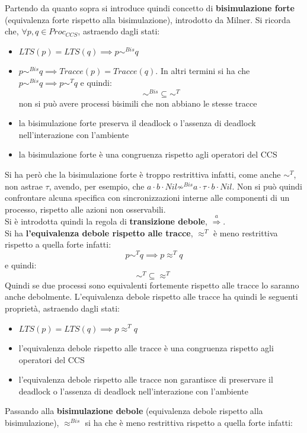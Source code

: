 Partendo da quanto sopra si introduce quindi concetto di \textbf{bisimulazione
  forte} (equivalenza forte rispetto alla bisimulazione), introdotto da
Milner. Si ricorda che, $\forall p, q\in Proc_{CCS}$, 
astraendo dagli stati:
\begin{itemize}
  \item $LTS(p)=LTS(q)\implies p\sim^{Bis}q$
  
  \item $p\sim^{Bis}q\implies Tracce(p)=Tracce(q)$. In altri termini si ha che
  $p\sim^{Bis}q\implies p\sim^T q$ e quindi:
  \[\sim^{Bis}\subseteq \sim^T\]
  non si può avere processi bisimili che non abbiano le stesse tracce
  \item la bisimulazione forte preserva il deadlock o l'assenza di deadlock
  nell'interazione con l'ambiente
  \item la bisimulazione forte è una congruenza rispetto agli operatori del CCS
\end{itemize}
Si ha però che la bisimulazione forte è troppo restrittiva infatti, come anche
$\sim^T$, non astrae $\tau$, avendo, per esempio, che $a\cdot b\cdot
Nil\not\sim^{Bis} a\cdot \tau\cdot b\cdot Nil$. Non si può quindi confrontare
alcuna specifica con sincronizzazioni interne alle componenti di un processo,
rispetto alle azioni non osservabili.\\ 
Si è introdotta quindi la regola di \textbf{transizione debole},
$\stackrel{a}{\Rightarrow}$.\\ 
Si ha \textbf{l'equivalenza debole rispetto alle tracce}, $\approx^T$ è meno
restrittiva rispetto a quella forte infatti:
\[p\sim^T q\implies p\approx^T q\]
e quindi:
\[\sim^T \subseteq \approx^T\]
Quindi se due processi sono equivalenti fortemente rispetto alle tracce lo
saranno anche debolmente. L'equivalenza debole rispetto alle tracce ha quindi le
seguenti proprietà, astraendo dagli stati:
\begin{itemize}
  \item $LTS(p)=LTS(q)\implies p\approx^{T}q$
  \item l'equivalenza debole rispetto alle tracce è una congruenza rispetto
  agli operatori del CCS 
  \item l'equivalenza debole rispetto alle tracce non garantisce di
  preservare il deadlock o l'assenza di deadlock nell'interazione con l'ambiente
\end{itemize}
Passando alla \textbf{bisimulazione debole} (equivalenza debole rispetto alla
bisimulazione), $\approx^{Bis}$ si ha che è meno 
restrittiva rispetto a quella forte infatti:
